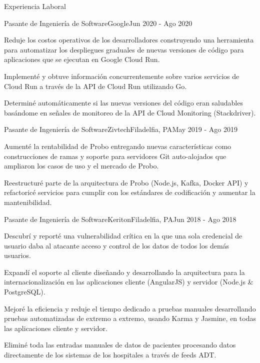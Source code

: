 \documentclass{resume} %
\begin{document}
\begin{rSection}{Experiencia Laboral}
		\begin{rSubsection}{Pasante de Ingeniería de Software}{Google}{}{Jun 2020 - Ago 2020}
			\item Reduje los costos operativos de los desarrolladores construyendo una herramienta para automatizar los despliegues graduales de nuevas versiones de código para aplicaciones que se ejecutan en Google Cloud Run.
			\item Implementé y obtuve información concurrentemente sobre varios servicios de Cloud Run a través de la API de Cloud Run utilizando Go.
			\item Determiné automáticamente si las nuevas versiones del código eran saludables basándome en señales de monitoreo de la API de Cloud Monitoring (Stackdriver).
		\end{rSubsection}
		
		\begin{rSubsection}{Pasante de Ingeniería de Software}{Zivtech}{Filadelfia, PA}{May 2019 - Ago 2019}
			\item Aumenté la rentabilidad de Probo entregando nuevas características como construcciones de ramas y soporte para servidores Git auto-alojados que ampliaron los casos de uso y el mercado de Probo.
			\item Reestructuré parte de la arquitectura de Probo (Node.js, Kafka, Docker API) y refactoricé servicios para cumplir con los estándares de codificación y aumentar la mantenibilidad.
		\end{rSubsection}
		
		\begin{rSubsection}{Pasante de Ingeniería de Software}{Keriton}{Filadelfia, PA}{Jun 2018 - Ago 2018}
			\item Descubrí y reporté una vulnerabilidad crítica en la que una sola credencial de usuario daba al atacante acceso y control de los datos de todos los demás usuarios.
			\item Expandí el soporte al cliente diseñando y desarrollando la arquitectura para la internacionalización en las aplicaciones cliente (AngularJS) y servidor (Node.js \& PostgreSQL).
			\item Mejoré la eficiencia y reduje el tiempo dedicado a pruebas manuales desarrollando pruebas automatizadas de extremo a extremo, usando Karma y Jasmine, en todas las aplicaciones cliente y servidor.
			\item Eliminé toda las entradas manuales de datos de pacientes procesando datos directamente de los sistemas de los hospitales a través de feeds ADT.
		\end{rSubsection}
		
	\end{rSection}
	
\end{document}
